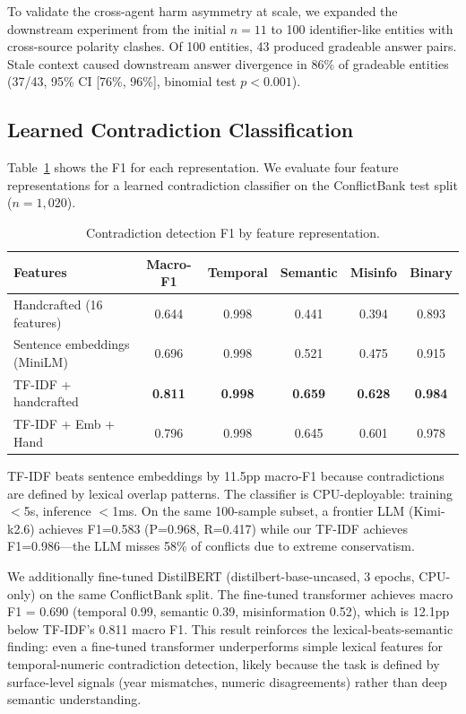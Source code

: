 \documentclass{article}
\begin{document}
To validate the cross-agent harm asymmetry at scale, we expanded the downstream experiment from the initial $n{=}11$ to 100 identifier-like entities with cross-source polarity clashes. Of 100 entities, 43 produced gradeable answer pairs. Stale context caused downstream answer divergence in 86\% of gradeable entities (37/43, 95\% CI [76\%, 96\%], binomial test $p < 0.001$).

\subsection{Learned Contradiction Classification}
\label{sec:learned}

Table~\ref{tab:feature-ablation} shows the F1 for each representation. We evaluate four feature representations for a learned contradiction classifier on the ConflictBank test split ($n{=}1{,}020$).

\begin{table}[h]
\centering
\caption{Contradiction detection F1 by feature representation.}
\label{tab:feature-ablation}
\begin{tabular}{lccccc}
\toprule
Features & Macro-F1 & Temporal & Semantic & Misinfo & Binary \\
\midrule
Handcrafted (16 features) & 0.644 & 0.998 & 0.441 & 0.394 & 0.893 \\
Sentence embeddings (MiniLM) & 0.696 & 0.998 & 0.521 & 0.475 & 0.915 \\
TF-IDF + handcrafted & \textbf{0.811} & \textbf{0.998} & \textbf{0.659} & \textbf{0.628} & \textbf{0.984} \\
TF-IDF + Emb + Hand & 0.796 & 0.998 & 0.645 & 0.601 & 0.978 \\
\bottomrule
\end{tabular}
\end{table}

TF-IDF beats sentence embeddings by 11.5pp macro-F1 because contradictions are defined by lexical overlap patterns. The classifier is CPU-deployable: training $<$5s, inference $<$1ms. On the same 100-sample subset, a frontier LLM (Kimi-k2.6) achieves F1=0.583 (P=0.968, R=0.417) while our TF-IDF achieves F1=0.986---the LLM misses 58\% of conflicts due to extreme conservatism.

We additionally fine-tuned DistilBERT (distilbert-base-uncased, 3 epochs, CPU-only) on the same ConflictBank split. The fine-tuned transformer achieves macro F1 = 0.690 (temporal 0.99, semantic 0.39, misinformation 0.52), which is 12.1pp below TF-IDF's 0.811 macro F1. This result reinforces the lexical-beats-semantic finding: even a fine-tuned transformer underperforms simple lexical features for temporal-numeric contradiction detection, likely because the task is defined by surface-level signals (year mismatches, numeric disagreements) rather than deep semantic understanding.
\end{document}
